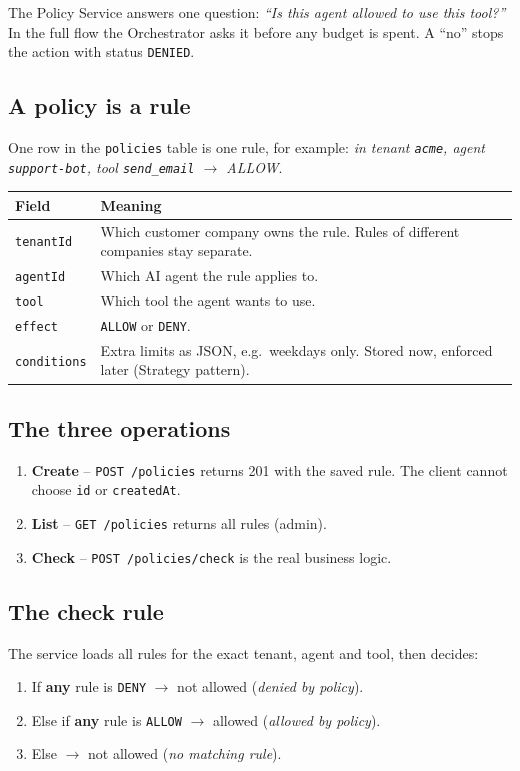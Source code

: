 \documentclass[11pt,a4paper]{article}
\newcommand{\code}[1]{\texttt{\small #1}}
\begin{document}
The Policy Service answers one question: \emph{``Is this agent allowed to use this tool?''}
In the full flow the Orchestrator asks it before any budget is spent. A ``no'' stops the
action with status \code{DENIED}.

\subsection{A policy is a rule}
One row in the \code{policies} table is one rule, for example:
\emph{in tenant \code{acme}, agent \code{support-bot}, tool \code{send\_email} $\rightarrow$ ALLOW}.

\begin{tabular}{@{}p{2.8cm}p{12.2cm}@{}}
\toprule
\textbf{Field} & \textbf{Meaning} \\
\midrule
\code{tenantId} & Which customer company owns the rule. Rules of different companies stay separate. \\
\code{agentId}  & Which AI agent the rule applies to. \\
\code{tool}     & Which tool the agent wants to use. \\
\code{effect}   & \code{ALLOW} or \code{DENY}. \\
\code{conditions} & Extra limits as JSON, e.g.\ weekdays only. Stored now, enforced later (Strategy pattern). \\
\bottomrule
\end{tabular}

\subsection{The three operations}
\begin{enumerate}
  \item \textbf{Create} -- \code{POST /policies} returns 201 with the saved rule. The client cannot choose \code{id} or \code{createdAt}.
  \item \textbf{List} -- \code{GET /policies} returns all rules (admin).
  \item \textbf{Check} -- \code{POST /policies/check} is the real business logic.
\end{enumerate}

\subsection{The check rule}
The service loads all rules for the exact tenant, agent and tool, then decides:

\begin{enumerate}
  \item If \textbf{any} rule is \code{DENY} $\rightarrow$ not allowed (\emph{denied by policy}).
  \item Else if \textbf{any} rule is \code{ALLOW} $\rightarrow$ allowed (\emph{allowed by policy}).
  \item Else $\rightarrow$ not allowed (\emph{no matching rule}).
\end{enumerate}
\end{document}

